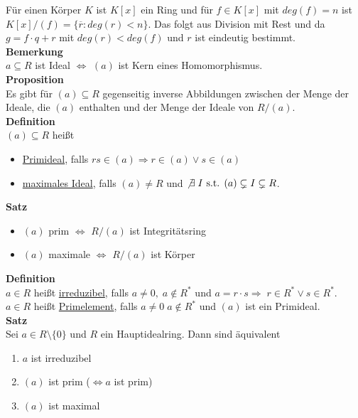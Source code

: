 \documentclass[a4paper, 12pt]{article}
\begin{document}
Für einen Körper $K$ ist $K[x]$ ein Ring und für $f \in K[x]$ mit $deg(f) = n$ ist $K[x]/(f) = \{\overline{r}: deg(r) < n\}$. Das folgt aus Division mit Rest und da $g = f\cdot q + r$ mit $deg(r) < deg(f)$ und $r$ ist eindeutig bestimmt.\\

\noindent\textbf{Bemerkung}\\
$a \subseteq R$ ist Ideal $\Leftrightarrow$ $(a)$ ist Kern eines Homomorphismus.\\
\textbf{Proposition}\\
Es gibt für $(a) \subseteq R$ gegenseitig inverse Abbildungen zwischen der Menge der Ideale, die $(a)$ enthalten und der Menge der Ideale von $R/(a)$.\\
\textbf{Definition}\\
$(a) \subseteq R$ heißt \begin{itemize}
	\item \underline{Primideal}, falls $rs \in (a) \Rightarrow r \in (a) \lor s \in (a)$
	\item \underline{maximales Ideal}, falls $(a) \neq R$ und $\not \exists\; I \text{ s.t. } (a) \subsetneq I \subsetneq R$.
\end{itemize} 
\textbf{Satz}\begin{itemize}
	\item $(a)$ prim $\Leftrightarrow$ $R/(a)$ ist Integritätsring
	\item $(a)$ maximale $\Leftrightarrow$ $R/(a)$ ist Körper
\end{itemize}
\textbf{Definition}\\
$a \in R$ heißt \underline{irreduzibel}, falls $a \neq 0, \; a \notin R^*$ und $a = r\cdot s \Rightarrow \; r \in R^* \lor s \in R^*$.\\
$a \in R$ heißt \underline{Primelement}, falls $a \neq 0 \; a \notin R^*$ und $(a)$ ist ein Primideal.\\
\textbf{Satz}\\
Sei $a \in R \setminus \{0\}$ und $R$ ein Hauptidealring. Dann sind äquivalent \begin{enumerate}
	\item $a$ ist irreduzibel
	\item $(a)$ ist prim ($\Leftrightarrow a$ ist prim)
	\item $(a)$ ist maximal
\end{enumerate}
\end{document}
